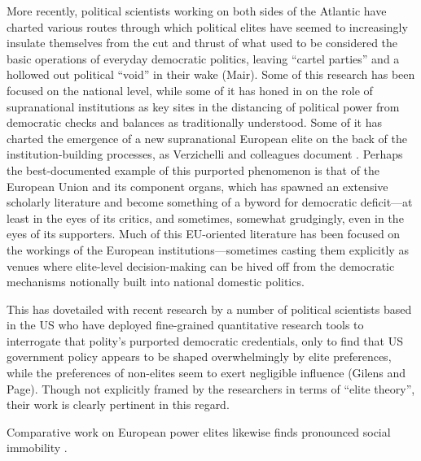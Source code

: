 \documentclass[11pt,a4paper]{article}
\begin{document}
More recently, political scientists working on both sides of the Atlantic have charted various routes through which political elites have seemed to increasingly insulate themselves from the cut and thrust of what used to be considered the basic operations of everyday democratic politics, leaving ``cartel parties'' and a hollowed out political ``void'' in their wake (Mair). Some of this research has been focused on the national level, while some of it has honed in on the role of supranational institutions as key sites in the distancing of political power from democratic checks and balances as traditionally understood. Some of it has charted the emergence of a new supranational European elite on the back of the institution-building processes, as Verzichelli and colleagues document \cite{best2012}. Perhaps the best-documented example of this purported phenomenon is that of the European Union and its component organs, which has spawned an extensive scholarly literature and become something of a byword for democratic deficit---at least in the eyes of its critics, and sometimes, somewhat grudgingly, even in the eyes of its supporters. Much of this EU-oriented literature has been focused on the workings of the European institutions---sometimes casting them explicitly as venues where elite-level decision-making can be hived off from the democratic mechanisms notionally built into national domestic politics.

This has dovetailed with recent research by a number of political scientists based in the US who have deployed fine-grained quantitative research tools to interrogate that polity's purported democratic credentials, only to find that US government policy appears to be shaped overwhelmingly by elite preferences, while the preferences of non-elites seem to exert negligible influence (Gilens and Page). Though not explicitly framed by the researchers in terms of ``elite theory'', their work is clearly pertinent in this regard.

Comparative work on European power elites likewise finds pronounced social immobility \cite{carboni2024}.
\end{document}

